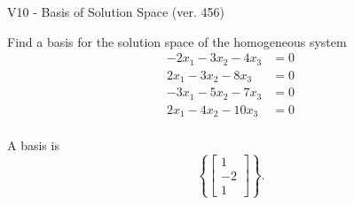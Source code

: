 \begin{exercise}
  \begin{exerciseTitle}V10 - Basis of Solution Space (ver. 456)\end{exerciseTitle}
  \begin{exerciseStatement}
    Find a basis for the solution space of the homogeneous system 
\begin{align*}
 -2 x_ 1 -3 x_ 2 -4 x_ 3 &= 0  \\ 
  2 x_ 1 -3 x_ 2 -8 x_ 3 &= 0  \\ 
  -3 x_ 1 -5 x_ 2 -7 x_ 3 &= 0  \\ 
  2 x_ 1 -4 x_ 2 -10 x_ 3 &= 0  \\ 
 \end{align*}


 
  \end{exerciseStatement}

  \begin{exerciseAnswer}
   A basis is   
\[\left\{\left[\begin{array}{c}
1 \\
-2 \\
1
\end{array}\right]\right\}.\]

  


  \end{exerciseAnswer}
\end{exercise}
